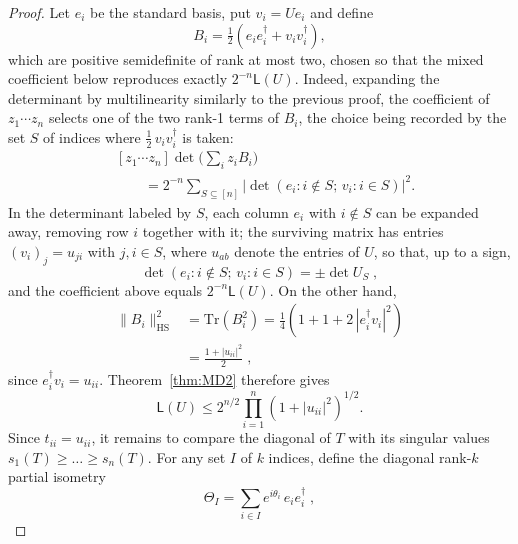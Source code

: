 \documentclass[prx,twocolumn,superscriptaddress,aps,10pt, frontmatterverbose, reprint,footinbib,longbibliography=true]{revtex4-2}
\begin{document}
\begin{proof}
Let $e_i$ be the standard basis, put $v_i=Ue_i$ and define
\begin{equation}
    B_i=\tfrac12\left(e_ie_i^\dagger+v_iv_i^\dagger\right),
\end{equation}
 which are positive semidefinite of rank at most two, chosen so that the mixed coefficient below reproduces exactly $2^{-n}\mathsf{L}(U)$. Indeed, expanding the determinant by multilinearity similarly to the previous proof, the coefficient of $z_1\cdots z_n$ selects one of the two rank-1 terms of $B_i$, the choice being recorded by the set $S$ of indices where $\tfrac12\,v_iv_i^\dagger$ is taken:
\begin{equation}
\begin{split}
    &[z_1\cdots z_n]\det\!\Big(\sum_iz_iB_i\Big)\\ &\qquad =2^{-n}\!\!\sum_{S\subseteq[n]}\left|\det(e_i:i\notin S;\,v_i:i\in S)\right|^2 .
\end{split}
\end{equation}In the determinant labeled by $S$, each column $e_i$ with $i\notin S$ can be expanded away, removing row $i$ together with it; the surviving matrix has entries $(v_i)_j=u_{ji}$ with $j,i\in S$, where $u_{ab}$ denote the entries of $U$, so that, up to a sign,
\begin{equation}
    \det\left(e_i:i\notin S;\,v_i:i\in S\right)=\pm\det U_S\;,
\end{equation}
and the coefficient above equals $2^{-n}\mathsf{L}(U)$. On the other hand,
\begin{equation}
\begin{split}
    \|B_i\|^2_{\mathrm{HS}}&=\mathrm{Tr}(B_i^2)=\tfrac14\left(1+1+2\,|e_i^\dagger v_i|^2\right)\\
    &=\frac{1+|u_{ii}|^2}{2}\;,
\end{split}
\end{equation}
since $e_i^\dagger v_i=u_{ii}$. Theorem~\ref{thm:MD2} therefore gives
\begin{equation}
    \mathsf{L}(U)\le 2^{n/2}\prod_{i=1}^n\left(1+|u_{ii}|^2\right)^{1/2} .
    \label{eq:UL-first}
\end{equation}
Since $t_{ii}=u_{ii}$, it remains to compare the diagonal of $T$ with its singular values $s_1(T)\ge\dots\ge s_n(T)$. For any set $I$ of $k$ indices, define the diagonal rank-$k$ partial isometry
\begin{equation}
    \Theta_I=\sum_{i\in I}e^{i\theta_i}\,e_ie_i^\dagger\;,
\end{equation}

\end{proof}
\end{document}

